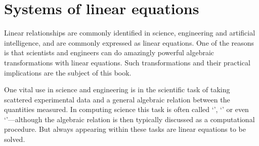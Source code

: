 
\chapter{Systems of linear equations}
\label{ch:sle}

\minitoc
{}


Linear relationships are commonly identified in science, engineering and artificial intelligence, and are commonly expressed as linear equations.
One of the reasons is that scientists and engineers can do amazingly powerful algebraic transformations with linear equations.
Such transformations and their practical implications are the subject of this book.

One vital use in science and engineering is in the scientific task of taking scattered experimental data and  a general algebraic relation between the quantities measured.
In computing science this task is often called `', `' or even `'---although  the algebraic relation is then typically discussed as a computational procedure.
But always appearing within these tasks are linear equations to be solved.

